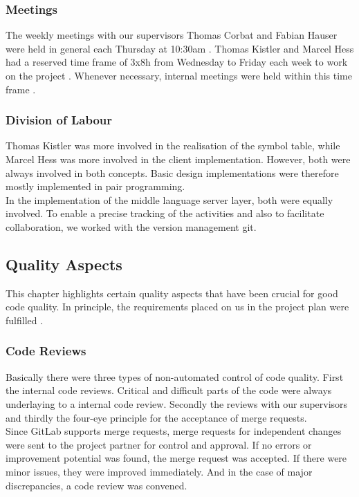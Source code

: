 \subsubsection{Meetings}
The weekly meetings with our supervisors Thomas Corbat and Fabian Hauser were held in general each Thursday at 10:30am \cite{projectplan}.
Thomas Kistler and Marcel Hess had a reserved time frame of 3x8h from Wednesday to
Friday each week to work on the project \cite{projectplan}.
Whenever necessary, internal meetings were held within this time frame \cite{projectplan}.

\subsubsection{Division of Labour}
Thomas Kistler was more involved in the realisation of the symbol table,
while Marcel Hess was more involved in the client implementation.
However, both were always involved in both concepts.
Basic design implementations were therefore mostly implemented in pair programming.\\

In the implementation of the middle language server layer, both were equally involved.
To enable a precise tracking of the activities and also to facilitate collaboration,
we worked with the version management git.

\subsection{Quality Aspects}
This chapter highlights certain quality aspects that have been crucial for good code quality.
In principle, the requirements placed on us in the project plan were fulfilled \cite{projectplan}.

\subsubsection{Code Reviews}
Basically there were three types of non-automated control of code quality.
First the internal code reviews. Critical and difficult parts of the code were always underlaying to a internal code review.
Secondly the reviews with our supervisors and
thirdly the four-eye principle for the acceptance of merge requests. \\

Since GitLab supports merge requests,
merge requests for independent changes were sent to the project partner for control and approval.
If no errors or improvement potential was found, the merge request was accepted.
If there were minor issues, they were improved immediately.
And in the case of major discrepancies, a code review was convened.

